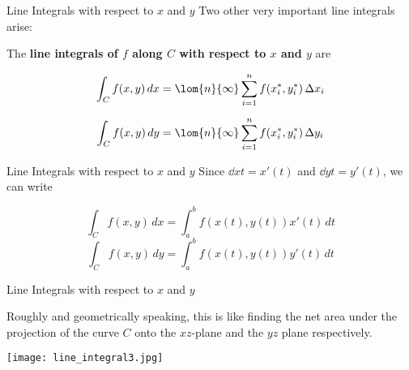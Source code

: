 \documentclass[11pt,english,
handout
]{beamer}
\begin{document}
\begin{frame}[t]{Line Integrals with respect to $x$ and $y$}
\small
Two other very important line integrals arise:

\lspace
\begin{definition}
The \textbf{line integrals of $f$ along $C$ with respect to $x$ and $y$} are

\begin{align*}
\int_Cf(x,y)\,dx&=\lom{n}{\infty}\sum_{i=1}^nf(x_i^*,y_i^*)\,\Delta x_i\\[2mm]
\int_Cf(x,y)\,dy&=\lom{n}{\infty}\sum_{i=1}^nf(x_i^*,y_i^*)\,\Delta y_i
\end{align*}
\end{definition}
\end{frame}









\begin{frame}[t]{Line Integrals with respect to $x$ and $y$}
\small 
Since $\dd{x}{t}=x'(t)$ and $\dd{y}{t}=y'(t)$, we can write


\lspace
\[
\boxed{\int_Cf(x,y)\,dx=\int_a^bf(x(t),y(t))x'(t)\,dt}
\]
\[
\boxed{\int_Cf(x,y)\,dy=\int_a^bf(x(t),y(t))y'(t)\,dt}
\]
\end{frame}









\begin{frame}[t]{Line Integrals with respect to $x$ and $y$}
\small 

Roughly and geometrically speaking, this is like finding the net area under the projection of the curve $C$ onto the $xz$-plane and the $yz$ plane respectively.

\lspace
\begin{center}
\texttt{[image: line\_integral3.jpg]}
\end{center}
\end{frame}
\end{document}
